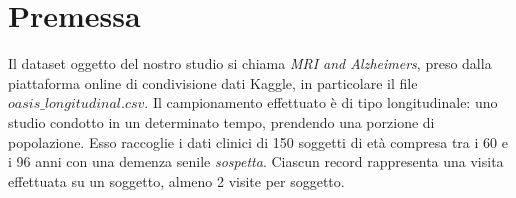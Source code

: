 \section{Premessa}
Il dataset oggetto del nostro studio si chiama \textit{MRI and Alzheimers}, preso dalla piattaforma online di condivisione dati Kaggle, in particolare il file $oasis\_longitudinal.csv$. Il campionamento effettuato è di tipo longitudinale:  uno studio condotto in un determinato tempo, prendendo una porzione di popolazione.
Esso raccoglie i dati clinici di 150 soggetti di età compresa tra i 60 e i 96 anni con una demenza senile \textit{sospetta}. Ciascun record rappresenta una visita effettuata su un soggetto, almeno 2 visite per soggetto.

